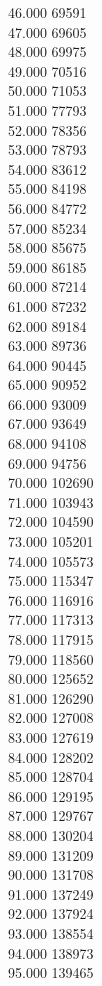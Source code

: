 { 46.000	69591 \\
 47.000	69605 \\
 48.000	69975 \\
 49.000	70516 \\
 50.000	71053 \\
 51.000	77793 \\
 52.000	78356 \\
 53.000	78793 \\
 54.000	83612 \\
 55.000	84198 \\
 56.000	84772 \\
 57.000	85234 \\
 58.000	85675 \\
 59.000	86185 \\
 60.000	87214 \\
 61.000	87232 \\
 62.000	89184 \\
 63.000	89736 \\
 64.000	90445 \\
 65.000	90952 \\
 66.000	93009 \\
 67.000	93649 \\
 68.000	94108 \\
 69.000	94756 \\
 70.000	102690 \\
 71.000	103943 \\
 72.000	104590 \\
 73.000	105201 \\
 74.000	105573 \\
 75.000	115347 \\
 76.000	116916 \\
 77.000	117313 \\
 78.000	117915 \\
 79.000	118560 \\
 80.000	125652 \\
 81.000	126290 \\
 82.000	127008 \\
 83.000	127619 \\
 84.000	128202 \\
 85.000	128704 \\
 86.000	129195 \\
 87.000	129767 \\
 88.000	130204 \\
 89.000	131209 \\
 90.000	131708 \\
 91.000	137249 \\
 92.000	137924 \\
 93.000	138554 \\
 94.000	138973 \\
 95.000	139465 \\
}
